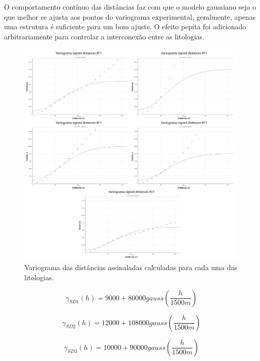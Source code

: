 O comportamento contínuo das distâncias faz com que o modelo gaussiano seja o que melhor se ajusta aos pontos do variograma experimental, geralmente, apenas uma estrutura é suficiente para um bom ajuste. O efeito pepita foi adicionado arbitrariamente para controlar a interconexão entre as litologias.

\begin{figure}[!htb]
	\caption{\label{variogramas} Variograma das distâncias assinaladas calculadas para cada uma das litologias.}
	\begin{center}
		\includegraphics[width=\textwidth]{estudo_de_caso/var}
	\end{center}
\end{figure}

\begin{equation}
\label{varsd1}
\gamma_{SD1}(h)=9000+80000gauss\left(\frac{h}{1500m}\right)
\end{equation}

\begin{equation}
\label{varsd2}
\gamma_{SD2}(h)=12000+108000 gauss\left(\frac{h}{1500m}\right)
\end{equation}

\begin{equation}
\label{varsd3}
\gamma_{SD3}(h)=10000 +90000 gauss\left(\frac{h}{1500m}\right)
\end{equation}

